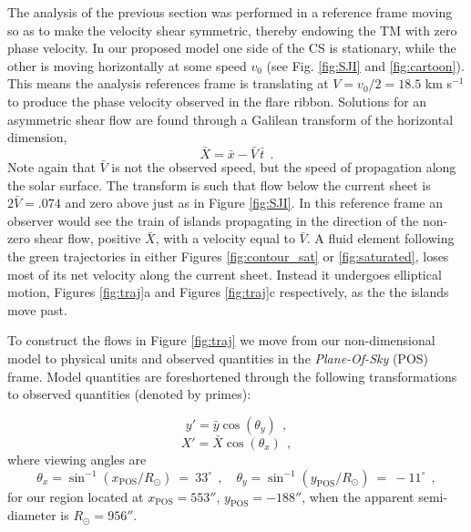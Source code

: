 	The analysis of the previous section was performed in a reference frame moving so as to make the velocity shear symmetric, thereby endowing the TM with zero phase velocity.  In our proposed model one side of the CS is stationary, while the other is moving horizontally at some speed $v_0$ (see Fig. \ref{fig:SJI} and \ref{fig:cartoon}).  This means the analysis references frame is translating at $V=v_0/2=18.5$ km s$^{-1}$ to produce the phase velocity observed in the flare ribbon. Solutions for an asymmetric shear flow are found through a Galilean transform of the horizontal dimension,
	\begin{equation}
		\label{eqn:lorentz}
		\bar{X} = \bar{x} - \bar{V} \,\bar{t}~~.
	\end{equation}
Note again that $\bar{V}$ is not the observed speed, but the speed of propagation along the solar surface. The transform is such that flow below the current sheet is $2 \bar{V} = .074$ and zero above just as in Figure \ref{fig:SJI}. In this reference frame an observer would see the train of islands propagating in the direction of the non-zero shear flow, positive $\bar{X}$, with a velocity equal to $\bar{V}$. A fluid element following the green trajectories in either Figures \ref{fig:contour_sat} or \ref{fig:saturated}, loses most of its net velocity along the current sheet.  Instead it undergoes elliptical motion, Figures \ref{fig:traj}a and Figures \ref{fig:traj}c respectively, as the the islands move past. %

To construct the flows in Figure \ref{fig:traj} we move from our non-dimensional model to physical units and observed quantities in the \textit{Plane-Of-Sky} (POS) frame. Model quantities are foreshortened through the following transformations to observed quantities (denoted by primes):  
	
	\begin{equation}
		y' = \bar{y}\cos(\theta_y)~~, 
	\end{equation}
	\begin{equation}
		X' = \bar{X}\cos(\theta_x)~~,
	\end{equation}
where viewing angles are
	\begin{equation}
		\theta_x = \sin^{-1}(x_{\mathrm{POS}}/R_{\odot})~=~33^{\circ}~~,
		\quad \theta_y = \sin^{-1}(y_{\mathrm{POS}}/R_{\odot})~=~ -11^{\circ}~~,
        \end{equation}
for our region located at $x_{\mathrm{POS}}=553''$, $y_{\mathrm{POS}} = -188''$, when the apparent semi-diameter is $R_{\odot} = 956''$.

